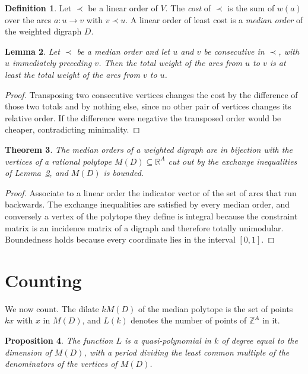 \documentclass[11pt]{article}
\theoremstyle{plain}
\newtheorem{theorem}{Theorem}[section]
\newtheorem{lemma}[theorem]{Lemma}
\newtheorem{proposition}[theorem]{Proposition}
\theoremstyle{definition}
\newtheorem{definition}[theorem]{Definition}
\newcommand{\ZZ}{\mathbb{Z}}
\newcommand{\RR}{\mathbb{R}}
\begin{document}
\begin{definition}\label{def:median}
Let $\prec$ be a linear order of $V$. The \emph{cost} of $\prec$ is the sum of $w(a)$ over the arcs $a \colon u \to v$ with $v \prec u$. A linear order of least cost is a \emph{median order} of the weighted digraph $D$.
\end{definition}

\begin{lemma}\label{lem:exchange}
Let $\prec$ be a median order and let $u$ and $v$ be consecutive in $\prec$, with $u$ immediately preceding $v$. Then the total weight of the arcs from $u$ to $v$ is at least the total weight of the arcs from $v$ to $u$.
\end{lemma}

\begin{proof}
Transposing two consecutive vertices changes the cost by the difference of those two totals and by nothing else, since no other pair of vertices changes its relative order. If the difference were negative the transposed order would be cheaper, contradicting minimality.
\end{proof}

\begin{theorem}\label{thm:polytope}
The median orders of a weighted digraph are in bijection with the vertices of a rational polytope $M(D) \subseteq \RR^{A}$ cut out by the exchange inequalities of Lemma~\ref{lem:exchange}, and $M(D)$ is bounded.
\end{theorem}

\begin{proof}
Associate to a linear order the indicator vector of the set of arcs that run backwards. The exchange inequalities are satisfied by every median order, and conversely a vertex of the polytope they define is integral because the constraint matrix is an incidence matrix of a digraph and therefore totally unimodular. Boundedness holds because every coordinate lies in the interval $[0,1]$.
\end{proof}

\section{Counting}

We now count. The dilate $kM(D)$ of the median polytope is the set of points $kx$ with $x$ in $M(D)$, and $L(k)$ denotes the number of points of $\ZZ^{A}$ in it.

\begin{proposition}\label{prop:quasi}
The function $L$ is a quasi-polynomial in $k$ of degree equal to the dimension of $M(D)$, with a period dividing the least common multiple of the denominators of the vertices of $M(D)$.
\end{proposition}
\end{document}
